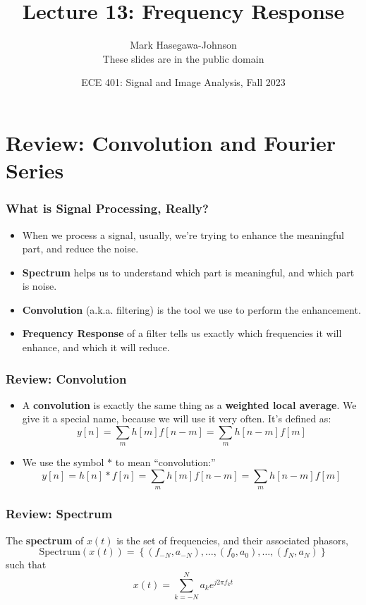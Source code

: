 \documentclass{beamer}
\title{Lecture 13: Frequency Response}
\author{Mark Hasegawa-Johnson\\These slides are in the public domain}
\date{ECE 401: Signal and Image Analysis, Fall 2023}
\begin{document}
\begin{frame}
  \maketitle
\end{frame}

\begin{frame}
  \tableofcontents
\end{frame}

\section[Review]{Review: Convolution and Fourier Series}
\setcounter{subsection}{1}

\begin{frame}
  \frametitle{What is Signal Processing, Really?}

  \begin{itemize}
  \item When we process a signal, usually, we're trying to
    enhance the meaningful part, and reduce the noise.
  \item {\bf Spectrum} helps us  to understand which part is
    meaningful, and which part is noise.
  \item {\bf Convolution} (a.k.a. filtering) is the tool we use to
    perform the enhancement.
  \item {\bf Frequency Response} of a filter tells us exactly which
    frequencies it will enhance, and which it will reduce.
  \end{itemize}
\end{frame}

\begin{frame}
  \frametitle{Review: Convolution}
  \begin{itemize}
  \item A {\bf convolution} is exactly the same thing as a {\bf weighted local average}.
    We give it a special name, because we will use it very often.  It's defined as:
    \[
    y[n] = \sum_m h[m] f[n-m] = \sum_m h[n-m] f[m]
    \]
  \item 
    We use the symbol $\ast$ to mean ``convolution:''
    \[
    y[n]=h[n]\ast f[n] = \sum_m h[m] f[n-m] = \sum_m h[n-m] f[m]
    \]
  \end{itemize}
\end{frame}

\begin{frame}
  \frametitle{Review: Spectrum}

  The {\bf spectrum} of $x(t)$ is the set of frequencies, and their
  associated phasors,
  \[
  \mbox{Spectrum}\left( x(t) \right) =
  \left\{ (f_{-N},a_{-N}), \ldots, (f_0,a_0), \ldots, (f_N,a_N) \right\}
  \]
  such that
  \[
  x(t) = \sum_{k=-N}^N a_ke^{j2\pi f_kt}
  \]
\end{frame}
\end{document}
